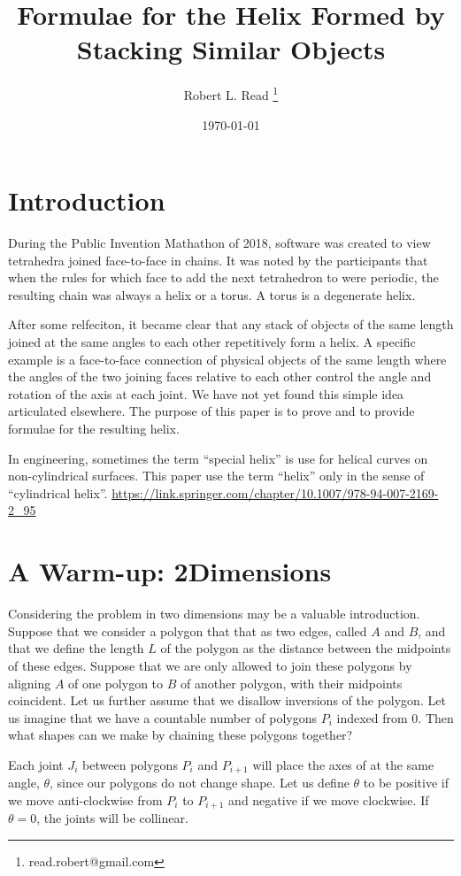 \documentclass[11pt]{article}
\title{Formulae for the Helix Formed by Stacking Similar Objects}
\author{Robert L. Read
  \thanks{read.robert@gmail.com}
}
\affil{Founder, Public Invention, an educational non-profit.}
\date{\today}
\begin{document}
\maketitle


\section{Introduction}

During the Public Invention Mathathon of 2018, software was created to view tetrahedra joined face-to-face in chains. It
was noted by the participants that when the rules for which face to add the next tetrahedron to were periodic, the resulting
chain was always a helix or a torus. A torus is a degenerate helix.

After some relfeciton, it became clear that any stack of objects of the same length joined at the same angles to each other repetitively form a helix. 
A specific example is a face-to-face connection of physical objects of the same length where the angles of the two joining
faces relative to each other control the angle and rotation of the axis at each joint. We have not yet found this simple idea articulated elsewhere. The purpose of this paper is to prove and to provide formulae for the resulting helix.

In engineering, sometimes the term ``special helix'' is use for helical curves on non-cylindrical surfaces. This paper use the term ``helix'' only in the sense of ``cylindrical helix''.
\url{https://link.springer.com/chapter/10.1007/978-94-007-2169-2_95}

\section{A Warm-up: 2Dimensions}

Considering the problem in two dimensions may be a valuable introduction.
Suppose that we consider a polygon that that as two edges, called $A$ and $B$, and that we define the length $L$ of the
polygon as the distance between the midpoints of these edges. Suppose that we are only allowed to join these
polygons by aligning $A$ of one polygon to $B$ of another polygon, with their midpoints coincident. Let us
further assume that we disallow inversions of the polygon.  Let us imagine that we have a
countable number of polygons $P_i$ indexed from $0$. Then what shapes can we make by chaining these
polygons together?

Each joint $J_i$ between polygons $P_i$ and $P_{i+1}$ will place the axes of at the same angle, $\theta$, since
our polygons do not change shape. Let us define $\theta$ to be positive
if we move anti-clockwise from $P_i$ to $P_{i+1}$ and negative if we move clockwise. 
If $\theta = 0$, the joints will be collinear.
\end{document}
